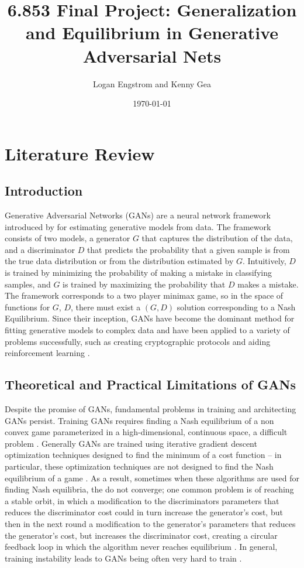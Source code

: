 \documentclass{article}
\title{6.853 Final Project: Generalization and Equilibrium in Generative Adversarial Nets}
\author{Logan Engstrom and Kenny Gea}
\date{\today}
\begin{document}
\maketitle

\section{Literature Review}
\subsection{Introduction}
Generative Adversarial Networks (GANs) are a neural network framework introduced by \citet{Goodfellow2014} for estimating generative models from data. The framework consists of two models, a generator $G$ that captures the distribution of the data, and a discriminator $D$ that predicts the probability that a given sample is from the true data distribution or from the distribution estimated by $G$. Intuitively, $D$ is trained by minimizing the probability of making a mistake in classifying samples, and $G$ is trained by maximizing the probability that $D$ makes a mistake. The framework corresponds to a two player minimax game, so in the space of functions for $G$, $D$, there must exist a $(G,D)$ solution corresponding to a Nash Equilibrium. Since their inception, GANs have become the dominant method for fitting generative models to complex data \citep{Arora17} and have been applied to a variety of problems successfully, such as creating cryptographic protocols \citep{Abadi16} and aiding reinforcement learning \citep{FinnGL16}.

\subsection{Theoretical and Practical Limitations of GANs}
Despite the promise of GANs, fundamental problems in training and architecting GANs persist. Training GANs requires finding a Nash equilibrium of a non convex game parameterized in a high-dimensional, continuous space, a difficult problem \citep{Goodfellow17} \citep{Salimans2016}. Generally GANs are trained using iterative gradient descent optimization techniques designed to find the minimum of a cost function – in particular, these optimization techniques are not designed to find the Nash equilibrium of a game \citep{Salimans2016}. As a result, sometimes when these algorithms are used for finding Nash equilibria, the do not converge; one common problem is of reaching a stable orbit, in which a modification to the discriminators parameters that reduces the discriminator cost could in turn increase the generator’s cost, but then in the next round a modification to the generator’s parameters that reduces the generator’s cost, but increases the discriminator cost, creating a circular feedback loop in which the algorithm never reaches equilibrium \citep{Salimans2016}. In general, training instability leads to GANs being often very hard to train \citep{DBLP:journals/corr/GulrajaniAADC17}.
\end{document}
